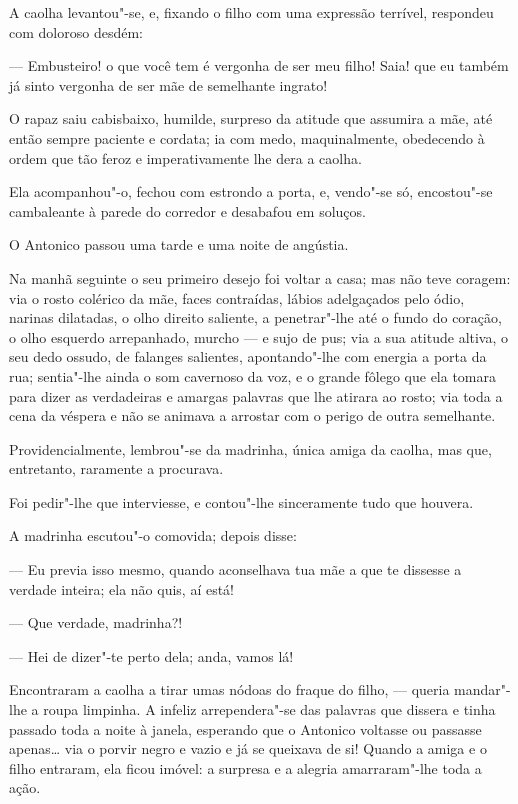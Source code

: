 A caolha levantou"-se, e, fixando o filho com uma expressão terrível,
respondeu com doloroso desdém:

--- Embusteiro! o que você tem é vergonha de ser meu filho! Saia! que eu
também já sinto vergonha de ser mãe de semelhante ingrato!

O rapaz saiu cabisbaixo, humilde, surpreso da atitude que assumira a
mãe, até então sempre paciente e cordata; ia com medo, maquinalmente,
obedecendo à ordem que tão feroz e imperativamente lhe dera a caolha.

Ela acompanhou"-o, fechou com estrondo a porta, e, vendo"-se só,
encostou"-se cambaleante à parede do corredor e desabafou em soluços.

O Antonico passou uma tarde e uma noite de angústia.

Na manhã seguinte o seu primeiro desejo foi voltar a casa; mas não teve
coragem: via o rosto colérico da mãe, faces contraídas, lábios
adelgaçados pelo ódio, narinas dilatadas, o olho direito saliente, a
penetrar"-lhe até o fundo do coração, o olho esquerdo arrepanhado, murcho
--- e sujo de pus; via a sua atitude altiva, o seu dedo ossudo, de
falanges salientes, apontando"-lhe com energia a porta da rua; sentia"-lhe
ainda o som cavernoso da voz, e o grande fôlego que ela tomara para
dizer as verdadeiras e amargas palavras que lhe atirara ao rosto; via
toda a cena da véspera e não se animava a arrostar com o perigo de outra
semelhante.

Providencialmente, lembrou"-se da madrinha, única amiga da caolha, mas
que, entretanto, raramente a procurava.

Foi pedir"-lhe que interviesse, e contou"-lhe sinceramente tudo que
houvera.

A madrinha escutou"-o comovida; depois disse:

--- Eu previa isso mesmo, quando aconselhava tua mãe a que te dissesse a
verdade inteira; ela não quis, aí está!

--- Que verdade, madrinha?!

--- Hei de dizer"-te perto dela; anda, vamos lá!

Encontraram a caolha a tirar umas nódoas do fraque do filho, --- queria
mandar"-lhe a roupa limpinha. A infeliz arrependera"-se das palavras que
dissera e tinha passado toda a noite à janela, esperando que o Antonico
voltasse ou passasse apenas\ldots{} via o porvir negro e vazio e já se
queixava de si! Quando a amiga e o filho entraram, ela ficou imóvel: a
surpresa e a alegria amarraram"-lhe toda a ação.

